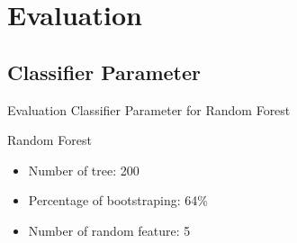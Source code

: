 \documentclass{beamer}
\begin{document}
\section{Evaluation}

\begin{frame}
	\begin{multicols}{2}
		\tableofcontents[currentsection]
	\end{multicols}
\end{frame}


\subsection{Classifier Parameter}

\begin{frame}
	{Evaluation}
	{Classifier Parameter for Random Forest}
	\begin{block}{Random Forest}
		\begin{itemize}
			\item Number of tree: 200
			\item Percentage of bootstraping: 64\%
			\item Number of random feature: 5
		\end{itemize}
	\end{block}
\end{frame}
\end{document}
